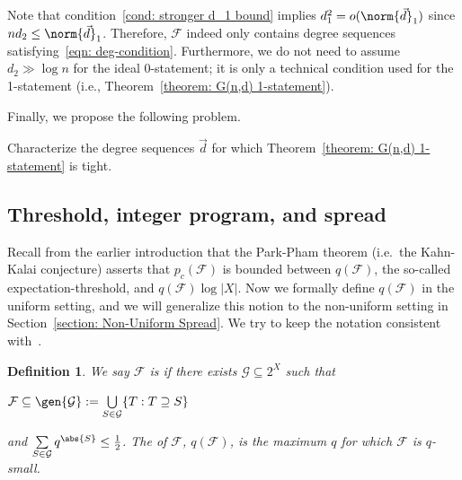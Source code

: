\documentclass[12pt]{article}
\newtheorem*{definition*}{Definition}
\begin{document}
\begin{remark}
\normalfont
\label{remark: G(n,d) remark}
Note that condition~\ref{cond: stronger d_1 bound} implies $d_1^2 = o(\norm{\vec{d}}_1)$ since $nd_2\leq\norm{\vec{d}}_1$. Therefore, $\mathcal{F}$ indeed only contains degree sequences satisfying~\eqref{eqn: deg-condition}. Furthermore, we do not need to assume $d_2\gg\log n$ for the ideal 0-statement; it is only a technical condition used for the 1-statement (i.e., Theorem~\ref{theorem: G(n,d) 1-statement}).
\end{remark}

Finally, we propose the following problem.

\begin{problem} 
Characterize the degree sequences $\vec{d}$ for which Theorem~\ref{theorem: G(n,d) 1-statement} is tight.
\end{problem}


\subsection{Threshold, integer program, and spread}
\label{section: Uniform Spread Intro}

Recall from the earlier introduction that the Park-Pham theorem (i.e.\ the Kahn-Kalai conjecture) asserts that $p_c(\mathcal{F})$ is bounded between $q(\mathcal{F})$, the so-called expectation-threshold, and $q(\mathcal{F})\log |X|$. Now we formally define $q(\mathcal{F})$ in the uniform setting, and we will generalize this notion to the non-uniform setting in Section~\ref{section: Non-Uniform Spread}. We try to keep the notation consistent with~\cite{park2023proofkahnkalaiconjecture}. 


 

\begin{definition*}
We say $\mathcal{F}$ is  if there exists $\mathcal{G}\subseteq 2^X$ such that
\begin{center}
    $\mathcal{F}\subseteq\gen{\mathcal{G}}:= \bigcup\limits_{S\in\mathcal{G}} \{T: T\supseteq S\}$
\end{center}
and $\sum\limits_{S\in\mathcal{G}} q^{\abs{S}}\leq \frac{1}{2}$. The  of $\mathcal{F}$, $q(\mathcal{F})$, is the maximum $q$ for which $\mathcal{F}$ is $q$-small.
\end{definition*}
\end{document}
